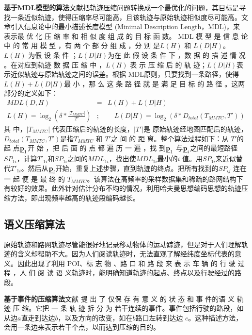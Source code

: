 \textbf{基于MDL模型的算法}文献\cite{DMDL2,MDL1}把轨迹压缩问题转换成一个最优化的问题，其目标是寻找一条近似轨迹，使得压缩率尽可能高，且该轨迹与原始轨迹相似度尽可能高。文章引入信息论中的最小描述长度模型 (Minimal Description Length，MDL)，来 表示最 优 化 压 缩 率 和 相 似 度 组 成 的 目 标 函 数。
MDL 模 型 是 信 息 论 中 的 常 用 模 型 ，有 两 个 部 分 组 成 ，分 别 是$L (H )$ 和 $L (D|H )$。$L (H )$ 为假 设 条 件 ；$L (D|H )$为在 此 假 设 条 件 下 ，数 据 的 描 述 情 况 。在对应到轨迹 数 据 压 缩 中 ，$L (H )$ 表 示 压 缩 后 的 轨 迹；$L (D|H )$表示近似轨迹与原始轨迹之间的误差。根据 MDL原则，只要找到一条路径，使得
 $L(H)+L (D|H )$最 小 ，那 么 这 条 路 径 就 是 满 足 目 标 的 路 径 。这两部分的定义如下：
 \begin{eqnarray}\label{eq:MDL}
 MDL(D,H)&=&L(H)+L(D|H) \\
 L(H)=\log_{2}(\delta *\frac{|T_{MMTC}|}{T'}) &;&\quad L(D|H)=\log_{2}(\delta *D_{total}(T_{MMTC},T'))
 \end{eqnarray}
 其 中，$|T_{MMTC}|$  代表压缩后的轨迹的长度，$|T′|$是 原始轨迹经地图匹配后的轨迹，$D_{total}(T_{MMTC},T')$是指$T_{MMTC}$  和 $T′$之 间 的 距 离。整个算法过程如下：从  $T′$的 起 点$\emph{{\textbf{p}}}_{1}$开 始 ，把 后 面 的 点 都 遍 历 一 遍 ，找 到$\emph{{\textbf{p}}}_{1}$ 与$\emph{{\textbf{p}}}_{i}$之间的最短路径$SP_{1i}$，计算$T′_{1i}$和$SP_{1i}$之间的$MDL_{1i}$，找出使$MDL_{1i}$最小的$i$ 值。用$SP_{1i}$来近似替代$T′_{1i}$。然后从$\emph{{\textbf{p}}}_{i}$开始，重复上述步骤，直到轨迹的终点。把所有找到的$SP_{ij}$ 连在一 起 便 是 最 终 的 $T_{MMTC}$。该算法在高频率的采样数据集和稀疏的路网结构下有较好的效果。此外针对估计分布不均的情况，\cite{hufmmanCompres}利用哈夫曼思想编码思想的轨迹压缩方法，即出现频率越高的轨迹段编码越长。
 
 \subsection{语义压缩算法}
 原始轨迹和路网轨迹尽管能很好地记录移动物体的运动踪迹，但是对于人们理解轨迹的含义却帮助不大。因为人们阅读轨迹时，无法直观了解经纬度坐标代表的意义。因此出现了利用 POI、标 志 物 、路 口 和 路 段 来 表 示 车 辆 的 行 驶 过 程 ，人 们 阅 读 语 义轨迹时，能明确知道轨迹的起点、终点以及行驶经过的路段。

\textbf{基于事件的压缩算法}文献\cite{Sementick,RichterSL12} 提 出 了 仅保 存 有 意 义 的 状 态 和 事 件的语 义 轨 迹 压 缩。它把 一 条 轨 迹 拆 分 为 若干连续的事件。事件包括行驶的路段，如从边$a$直走到达边$b$，以及方向的改变，如在$b$路口左转到达边 $c$。这种描述方法，会用一条边来表示若干个点，以而达到压缩的目的。

